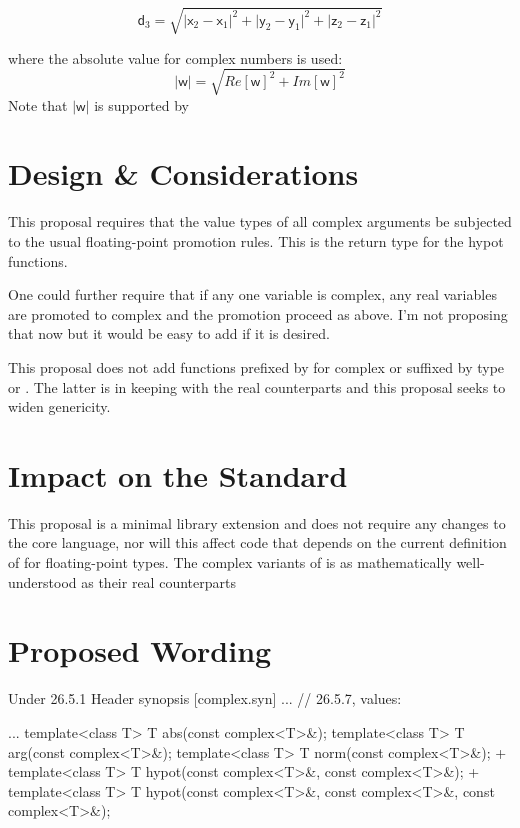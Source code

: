 \documentclass[ebook,10pt,oneside,openany,final]{memoir}
\begin{document}
\[%
\mathsf{d}_3 = \sqrt{\lvert\mathsf{x}_2 - \mathsf{x}_1\rvert^2
                   + \lvert\mathsf{y}_2 - \mathsf{y}_1\rvert^2
                   + \lvert\mathsf{z}_2 - \mathsf{z}_1\rvert^2}
\]

where the absolute value for complex numbers is used:
\[%
\lvert\mathsf{w}\rvert = \sqrt{Re[\mathsf{w}]^2 + Im[\mathsf{w}]^2}
\]
Note that $ \lvert\mathsf{w}\rvert $ is supported by 


\section{Design \& Considerations}

This proposal requires that the value types of all complex arguments be subjected to the usual
floating-point promotion rules.  This is the return type for the hypot functions.

One could further require that if any one variable is complex, any real variables are promoted to complex
and the promotion proceed as above.
I'm not proposing that now but it would be easy to add if it is desired.

This proposal does not add functions prefixed by  for complex or suffixed by type  or .
The latter is in keeping with the real counterparts and this proposal seeks to widen genericity.


\section{Impact on the Standard}

This  proposal is a minimal library extension and does not require any changes to the core language,
nor will this affect code that depends on the current definition of  for floating-point types.
The complex variants of  is as mathematically well-understood as their real counterparts


\section{Proposed Wording}

Under
26.5.1	Header  synopsis	[complex.syn]
...
// 26.5.7, values:
\begin{codeblock}
...
template<class T> T abs(const complex<T>\&);
template<class T> T arg(const complex<T>\&);
template<class T> T norm(const complex<T>\&);
+ template<class T> T hypot(const complex<T>\&, const complex<T>\&);
+ template<class T> T hypot(const complex<T>\&, const complex<T>\&, const complex<T>\&);
\end{codeblock}
\end{document}
